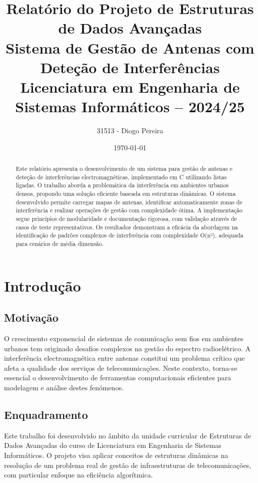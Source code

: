 \documentclass[a4paper,12pt]{report}
\title{%
  \textbf{Relatório do Projeto de Estruturas de Dados Avançadas}\\[2em]
  \large Sistema de Gestão de Antenas com Deteção de Interferências\\[2em]
  Licenciatura em Engenharia de Sistemas Informáticos -- 2024/25
}
\author{31513 - Diogo Pereira}
\date{\today}
\begin{document}
\maketitle

\begin{abstract}
Este relatório apresenta o desenvolvimento de um sistema para gestão de antenas e deteção de interferências electromagnéticas, implementado em C utilizando listas ligadas. O trabalho aborda a problemática da interferência em ambientes urbanos densos, propondo uma solução eficiente baseada em estruturas dinâmicas. O sistema desenvolvido permite carregar mapas de antenas, identificar automaticamente zonas de interferência e realizar operações de gestão com complexidade ótima. A implementação segue princípios de modularidade e documentação rigorosa, com validação através de casos de teste representativos. Os resultados demonstram a eficácia da abordagem na identificação de padrões complexos de interferência com complexidade O(n²), adequada para cenários de média dimensão.
\end{abstract}

\tableofcontents

\chapter{Introdução}
\section{Motivação}
O crescimento exponencial de sistemas de comunicação sem fios em ambientes urbanos tem originado desafios complexos na gestão do espectro radioelétrico. A interferência electromagnética entre antenas constitui um problema crítico que afeta a qualidade dos serviços de telecomunicações. Neste contexto, torna-se essencial o desenvolvimento de ferramentas computacionais eficientes para modelagem e análise destes fenómenos.

\section{Enquadramento}
Este trabalho foi desenvolvido no âmbito da unidade curricular de Estruturas de Dados Avançadas do curso de Licenciatura em Engenharia de Sistemas Informáticos. O projeto visa aplicar conceitos de estruturas dinâmicas na resolução de um problema real de gestão de infraestruturas de telecomunicações, com particular enfoque na eficiência algorítmica.
\end{document}
